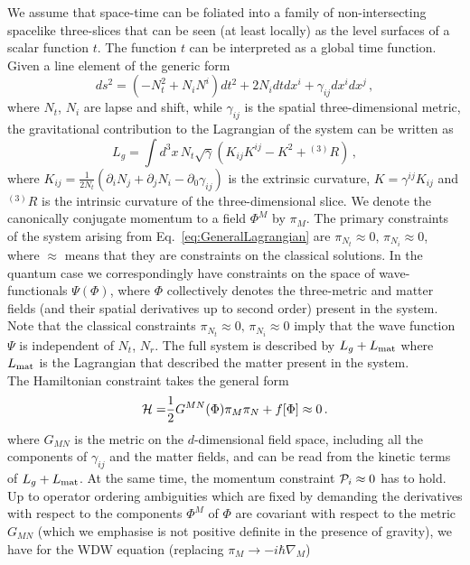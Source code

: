 \documentclass[a4paper,11pt]{article}
\numberwithin{equation}{section}
\begin{document}
We assume that space-time can be foliated into a family of non-intersecting spacelike three-slices that can be seen (at least locally) as the level surfaces of a scalar function $t$. The function $t$ can be interpreted as a global time function. Given a line element of the generic form
\begin{equation}
\label{eq:GeneralLineElement}
ds^2 = \left(-N_t^2 + N_i N^i\right) dt^2 + 2 N_i dt dx^i + \gamma_{ij} dx^i dx^j \,,
\end{equation}
where $N_t$, $N_i$ are lapse and shift, while $\gamma_{ij}$ is the spatial three-dimensional metric, the gravitational contribution to the Lagrangian of the system can be written as
\begin{equation}
\label{eq:GeneralLagrangian}
L_g = \int d^3x \, N_t \sqrt{\gamma} \left(K_{ij} K^{ij} - K^2 + {}^{(3)} R\right) \,,
\end{equation}
where $K_{ij} = \frac{1}{2 N_t} \left(\partial_i N_j + \partial_j N_i - \partial_0 \gamma_{ij}\right)$ is the extrinsic curvature, $K = \gamma^{ij} K_{ij}$ and ${}^{(3)} R$ is the intrinsic curvature of the three-dimensional slice. We denote the canonically conjugate momentum to a field $\Phi^M$  by $\pi_M$. The primary constraints of the system arising from Eq.~\eqref{eq:GeneralLagrangian} are $\pi_{N_{t}}\approx0,\,\pi_{N_{i}}\approx 0$, where $\approx$ means that they are constraints on the classical solutions. In the quantum case we correspondingly have constraints on the space of wave-functionals $\Psi(\Phi)$, where $\Phi$ collectively denotes the three-metric and matter fields (and their spatial derivatives up to second order) present in the system. Note that the classical constraints $\pi_{N_{t}}\approx0,\,\pi_{N_{i}}\approx 0$ imply that the wave function $\Psi$ is independent of $N_{t}$, $N_{r}$. The full system is described by $L_g + L_{\rm mat}$ where $L_{\rm mat}$ is the Lagrangian that described the matter present in the system.\\

The Hamiltonian constraint takes the general form
\begin{equation}
\label{eq:GeneralHamiltonian}
{\cal H=}\frac{1}{2}G^{MN}(\Phi)\pi_{M}\pi_{N}+f[\Phi]\approx0 \,.
\end{equation}
where $G_{MN}$ is the metric on the $d$-dimensional field space, including all the components of $\gamma_{ij}$ and the matter fields, and can be read from the kinetic terms of $L_g + L_{\rm mat}$. At the same time, the momentum constraint ${\cal P}_{i}\approx 0$ has to hold.  Up to operator ordering ambiguities which are fixed by demanding the derivatives with respect to the components $\Phi^{M}$ of $\Phi$ are covariant with respect to the metric $G_{MN}$ (which we emphasise is not positive definite in the presence of gravity), we have for the WDW equation (replacing $\pi_{M}\rightarrow-i\hbar\nabla_{M}$)
\end{document}
